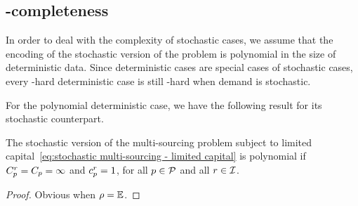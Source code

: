 \subsection{\NP-completeness}


In order to deal with the complexity of stochastic cases, we assume that the encoding of the stochastic version of the problem is polynomial in the size of deterministic data. Since deterministic cases are special cases of stochastic cases, every \NP-hard deterministic case is still \NP-hard when demand is stochastic.

For the polynomial deterministic case, we have the following result for its stochastic counterpart.

\begin{prop}
The stochastic version of the multi-sourcing problem subject to limited capital~\eqref{eq:stochastic multi-sourcing - limited capital} is polynomial if $C_p^r=C_p=\infty$ and $c_p^r=1$, for all $p\in\mathcal{P}$ and all $r\in\mathcal{I}$.
\end{prop}

\begin{proof}
Obvious when $\rho=\mathbb{E}$.


\tbc
\end{proof}



